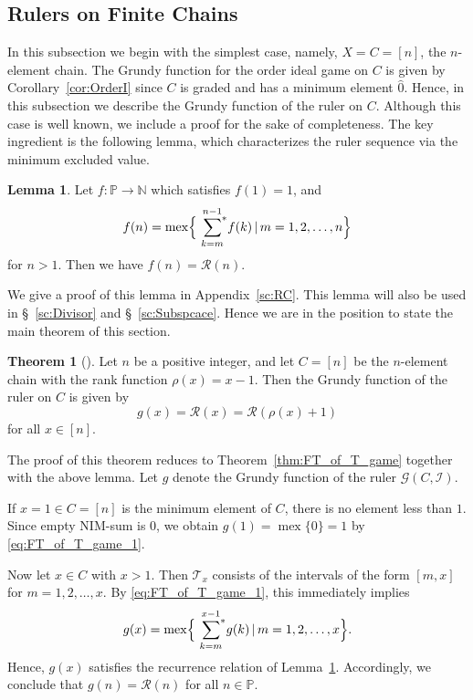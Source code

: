 \documentclass[a4paper,11pt]{amsart}
\theoremstyle{definition}
\newtheorem{thm}{Theorem}[section]
\newtheorem{lem}{Lemma}[section]
\newenvironment{demo}[1]{%
  \trivlist
  \item[\hskip\labelsep
        {\bf #1.}]
}{%
\hfill\qedsymbol
  \endtrivlist
}
\newcommand{\mex}{\operatorname{mex}}
\newcommand{\nimsum}{{\sum}^{*}}
\numberwithin{equation}{section}
\def\Non{\mathbb{N}}
\def\Pos{\mathbb{P}}
\def\Pgame{\mathscr{G}}
\def\T{\mathscr{T}}
\def\I{\mathscr{I}}
\def\fnh#1{\mathscr{R}\left({#1}\right)}
\def\rkf{\rho}
\begin{document}
\subsection{Rulers on Finite Chains}
%
In this subsection we begin with the simplest case,
namely, $X=C=[n]$, the $n$-element chain.
The Grundy function for the order ideal game on \(C\) is given by Corollary~\ref{cor:OrderI}
since $C$ is graded and has a minimum element $\hat0$.
Hence, in this subsection we describe the Grundy function of the ruler on \(C\). 
Although this case is well known,
we include a proof for the sake of completeness.
The key ingredient is the following lemma,
which characterizes the ruler sequence via the minimum excluded value.
%
%
\begin{lem}\label{lem:chain-ruler-recurrence}
%
Let $f:\Pos\to\Non$ which satisfies $f(1)=1$, and
%
\begin{equation}\label{eq:chain-ruler-recurrence}
f(n)=\mex\Bigl\{\overset{n-1}{\underset{k=m}{\,\,\,\nimsum}}f(k) \,|\, m=1,2,\dots,n\Bigr\}
\end{equation}
%
for $n>1$.
Then we have $f(n)=\fnh{n}$.
%
\end{lem}
%
%
We give a proof of this lemma in Appendix~\ref{sc:RC}.
This lemma will also be used in \S~\ref{sc:Divisor} and \S~\ref{sc:Subspcace}.
%
Hence we are in the position to state the main theorem of this section.
%
\begin{thm}[\cite{Sato}]\label{th:SGf-Chain-ruler}
%
Let $n$ be a positive integer,
and let $C=[n]$ be the $n$-element chain with the rank function $\rkf(x)=x-1$.
Then the Grundy function of the ruler on $C$ is given by
\begin{equation}
g(x)=\fnh{x}=\fnh{\rho(x)+1}
\end{equation}
for all $x\in [n]$.
%
\end{thm}
%
%
\begin{demo}{Proof}
%
The proof of this theorem reduces to Theorem~\ref{thm:FT_of_T_game} together with the above lemma.
%
Let $g$ denote the Grundy function of the ruler $\Pgame(C,\I)$.
%
\par
%
If $x=1\in C=[n]$ is the minimum element of $C$,
there is no element less than $1$.
Since empty NIM-sum is $0$,
we obtain $g(1)=\mex\{0\}=1$ by \eqref{eq:FT_of_T_game_1}.
%
\par
%
Now let $x\in C$ with $x>1$. 
Then $\T_{x}$ consists of the intervals of the form $[m,x]$ for $m=1,2,\dots,x$.
By \eqref{eq:FT_of_T_game_1},
this immediately implies
%
\begin{equation}\label{eq:rec-chain}
g(x)=\mex\Bigl\{\overset{x-1}{\underset{k=m}{\,\,\,\nimsum}}g(k) \,|\, m=1,2,\dots,x\Bigr\}.
\end{equation}
%
Hence, $g(x)$ satisfies the recurrence relation of Lemma~\ref{lem:chain-ruler-recurrence}.
Accordingly, we conclude that $g(n)=\fnh{n}$ for all $n\in\Pos$.
%
%
\end{demo}
%
%
%
\end{document}

